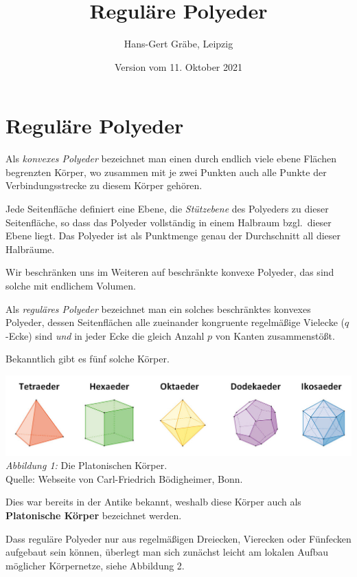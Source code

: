 \documentclass[11pt]{article}
\author{Hans-Gert Gräbe, Leipzig}
\title{Reguläre Polyeder\kosemnetlicensemark}
\date{Version vom 11. Oktober 2021}
\begin{document}
\maketitle

\section*{Reguläre Polyeder}

Als \emph{konvexes Polyeder} bezeichnet man einen durch endlich viele ebene
Flä\-chen begrenzten Körper, wo zusammen mit je zwei Punkten auch alle Punkte
der Verbindungsstrecke zu diesem Körper gehören.

Jede Seitenfläche definiert eine Ebene, die \emph{Stützebene} des Polyeders zu
dieser Seitenfläche, so dass das Polyeder vollständig in einem Halbraum
bzgl.\ dieser Ebene liegt. Das Polyeder ist als Punktmenge genau der
Durchschnitt all dieser Halbräume. 

Wir beschränken uns im Weiteren auf beschränkte konvexe Polyeder, das sind
solche mit endlichem Volumen. 

Als \emph{reguläres Polyeder} bezeichnet man ein solches beschränktes konvexes
Polyeder, dessen Seitenflächen alle zueinander kongruente regelmäßige Vielecke
($q$-Ecke) sind \emph{und} in jeder Ecke die gleich Anzahl $p$ von Kanten
zusammenstößt.

Bekanntlich gibt es fünf solche Körper.
\begin{center}
  \includegraphics[width=.8\textwidth]{graebe-05-1/PlatonischeKoerper.jpg}\\
  \emph{Abbildung 1:} Die Platonischen Körper.\\ Quelle: Webseite von
  Carl-Friedrich Bödigheimer, Bonn. 
\end{center}
Dies war bereits in der Antike bekannt, weshalb diese Körper auch als
\textbf{Platonische Körper} bezeichnet werden.  

Dass reguläre Polyeder nur aus regelmäßigen Dreiecken, Vierecken oder
Fünfecken aufgebaut sein können, überlegt man sich zunächst leicht am lokalen
Aufbau möglicher Körpernetze, siehe Abbildung 2.
\end{document}
